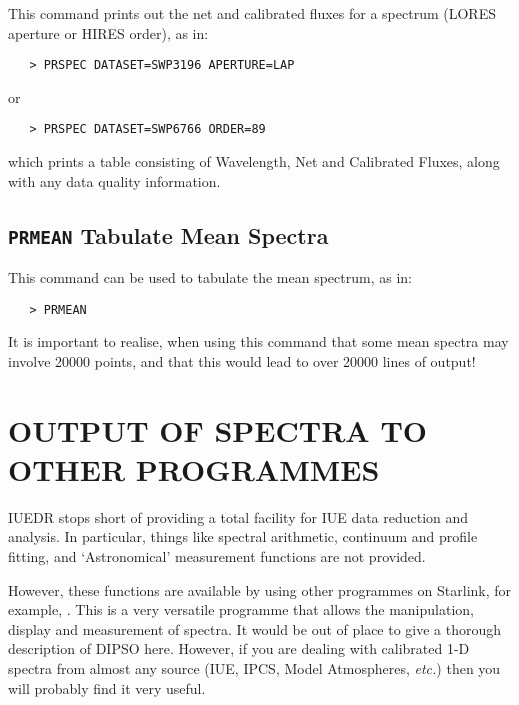 This command prints out the net and calibrated fluxes for a spectrum (LORES
aperture or HIRES order), as in:

\begin{verbatim}
   > PRSPEC DATASET=SWP3196 APERTURE=LAP
\end{verbatim}

or

\begin{verbatim}
   > PRSPEC DATASET=SWP6766 ORDER=89
\end{verbatim}

which prints a table consisting of Wavelength, Net and Calibrated Fluxes,
along with any data quality information.


\subsection{{\tt PRMEAN} Tabulate Mean Spectra}

This command can be used to tabulate the mean spectrum, as in:

\begin{verbatim}
   > PRMEAN
\end{verbatim}

It is important to realise, when using this command that some mean spectra may
involve 20000 points, and that this would lead to over 20000 lines of output!


\section{\label{se:spec_output}OUTPUT OF SPECTRA TO
         OTHER PROGRAMMES}

IUEDR stops short of providing a total facility for IUE data reduction and
analysis.  In particular, things like spectral arithmetic, continuum and
profile fitting, and `Astronomical' measurement functions are not
provided.

However, these functions are available by using other programmes on Starlink,
for example, \@.
This  is a very versatile programme that allows the manipulation, display and
measurement of spectra.  It would be out of place to give a thorough
description of DIPSO here.  However, if you are dealing with calibrated 1-D
spectra from almost any source (IUE, IPCS, Model Atmospheres, {\it etc.})
then you will probably find it very useful.

